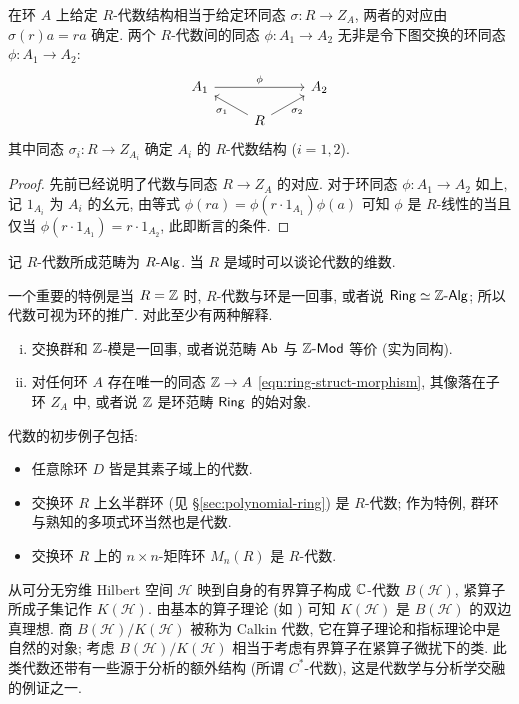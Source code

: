 \begin{proposition}\label{prop:algebra-as-homomorphism}
	在环 $A$ 上给定 $R$-代数结构相当于给定环同态 $\sigma: R \to Z_A$, 两者的对应由 $\sigma(r)a = ra$ 确定. 两个 $R$-代数间的同态 $\phi: A_1 \to A_2$ 无非是令下图交换的环同态 $\phi: A_1 \to A_2$:
	\[\begin{tikzcd}[row sep=small]
		A_1 \arrow[rr, "\phi"] & & A_2 \\
		& R \arrow[lu, "\sigma_1"] \arrow[ru, "\sigma_2"'] &
	\end{tikzcd}\]
	其中同态 $\sigma_i: R \to Z_{A_i}$ 确定 $A_i$ 的 $R$-代数结构 ($i=1,2$).
\end{proposition}
\begin{proof}
	先前已经说明了代数与同态 $R \to Z_A$ 的对应. 对于环同态 $\phi: A_1 \to A_2$ 如上, 记 $1_{A_i}$ 为 $A_i$ 的幺元, 由等式 $\phi(r a) = \phi(r \cdot 1_{A_1}) \phi(a)$ 可知 $\phi$ 是 $R$-线性的当且仅当 $\phi(r \cdot 1_{A_1}) = r \cdot 1_{A_2}$, 此即断言的条件.
\end{proof}

记 $R$-代数所成范畴为 $R\text{-}\mathsf{Alg}$. 当 $R$ 是域时可以谈论代数的维数.
\begin{remark}
	一个重要的特例是当 $R = \mathbb{Z}$ 时, $R$-代数与环是一回事, 或者说 $\mathsf{Ring} \simeq \mathbb{Z}\text{-}\mathsf{Alg}$; 所以代数可视为环的推广. 对此至少有两种解释.
	\begin{enumerate}[(i)]
		\item 交换群和 $\mathbb{Z}$-模是一回事, 或者说范畴 $\mathsf{Ab}$ 与 $\mathbb{Z}\text{-}\mathsf{Mod}$ 等价 (实为同构).
		\item 对任何环 $A$ 存在唯一的同态 $\mathbb{Z} \to A$ \eqref{eqn:ring-struct-morphism}, 其像落在子环 $Z_A$ 中, 或者说 $\mathbb{Z}$ 是环范畴 $\mathsf{Ring}$ 的始对象.
	\end{enumerate}
\end{remark}

代数的初步例子包括:
\begin{itemize}
	\item 任意除环 $D$ 皆是其素子域上的代数.
	\item 交换环 $R$ 上幺半群环 (见 \S\ref{sec:polynomial-ring}) 是 $R$-代数; 作为特例, 群环与熟知的多项式环当然也是代数.
	\item 交换环 $R$ 上的 $n \times n$-矩阵环 $M_n(R)$ 是 $R$-代数.
\end{itemize}

\begin{example}
	从可分无穷维 Hilbert 空间 $\mathcal{H}$ 映到自身的有界算子构成 $\mathbb{C}$-代数 $B(\mathcal{H})$, 紧算子所成子集记作 $K(\mathcal{H})$. 由基本的算子理论 (如 \cite[\S 4.1]{Zh1}) 可知 $K(\mathcal{H})$ 是 $B(\mathcal{H})$ 的双边真理想. 商 $B(\mathcal{H})/K(\mathcal{H})$ 被称为 Calkin 代数, 它在算子理论和指标理论中是自然的对象; 考虑 $B(\mathcal{H})/K(\mathcal{H})$ 相当于考虑有界算子在紧算子微扰下的类. 此类代数还带有一些源于分析的额外结构 (所谓 $C^*$-代数), 这是代数学与分析学交融的例证之一.
\end{example}

